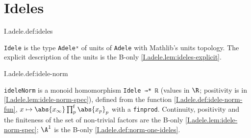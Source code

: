 \begin{tfoutline}
\end{tfoutline}

\section{Ideles}

\begin{definition}[ideles]
\end{definition}
\begin{tfformal}{I.adele.def:ideles}
\begin{tffidelity}
\texttt{Idele} is the type \texttt{Adeleˣ} of units of \texttt{Adele} with Mathlib's units topology. The explicit description of the units is the B-only \cref{I.adele.lem:ideles-explicit}.
\end{tffidelity}
\end{tfformal}

\begin{definition}
\end{definition}
\begin{tfformal}{I.adele.def:idele-norm}
\begin{tffidelity}
\texttt{ideleNorm} is a monoid homomorphism \texttt{Idele →* ℝ} (values in $\R$; positivity is in \cref{I.adele.lem:idele-norm-spec}), defined from the function \cref{I.adele.def:idele-norm-fun}, $x\mapsto\abs{x_\infty}\prod^{\mathrm f}_p\abs{x_p}_p$ with a \texttt{finprod}. Continuity, positivity and the finiteness of the set of non-trivial factors are the B-only \cref{I.adele.lem:idele-norm-spec}; $\A^1$ is the B-only \cref{I.adele.def:norm-one-ideles}.
\end{tffidelity}
\end{tfformal}

